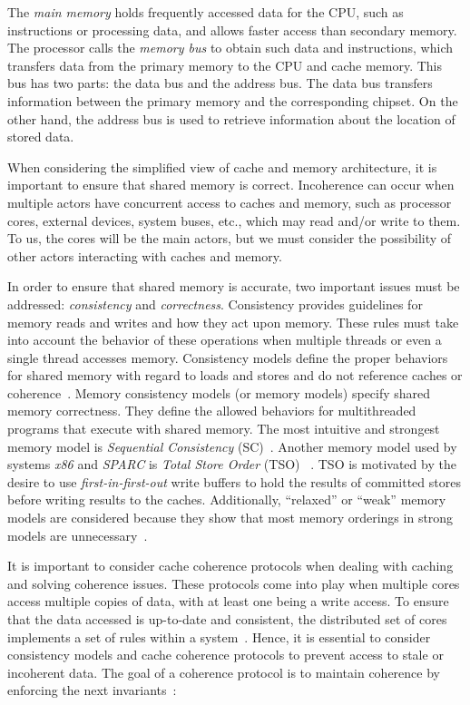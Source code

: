 The \emph{main memory} holds frequently accessed data for the CPU, such as instructions or processing data, and allows faster access than secondary memory. The processor calls the \emph{memory bus} to obtain such data and instructions, which transfers data from the primary memory to the CPU and cache memory. This bus has two parts: the data bus and the address bus. The data bus transfers information between the primary memory and the corresponding chipset. On the other hand, the address bus is used to retrieve information about the location of stored data.


When considering the simplified view of cache and memory architecture, it is important to ensure that shared memory is correct. Incoherence can occur when multiple actors have concurrent access to caches and memory, such as processor cores, external devices, system buses, etc., which may read and/or write to them. To us, the cores will be the main actors, but we must consider the possibility of other actors interacting with caches and memory.

In order to ensure that shared memory is accurate, two important issues must be addressed: \emph{consistency} and \emph{correctness}. Consistency provides guidelines for memory reads and writes and how they act upon memory. These rules must take into account the behavior of these operations when multiple threads or even a single thread accesses memory. Consistency models define the proper behaviors for shared memory with regard to loads and stores and do not reference caches or coherence~\cite{DBLP_series_synthesis_2020Nagarajan}. Memory consistency models (or memory models) specify shared memory correctness. They define the allowed behaviors for multithreaded programs that execute with shared memory. The most intuitive and strongest memory model is \emph{Sequential Consistency} (SC)~\cite{lamport1979how}. Another memory model used by systems \emph{x86} and \emph{SPARC} is \emph{Total Store Order} (TSO) ~\cite{DBLP_conf_tphol_OwensSS09, DBLP_journals_cacm_SewellSONM10, sparc1992sparc}. TSO is motivated by the desire to use \emph{first-in-first-out} write buffers to hold the results of committed stores before writing results to the caches. Additionally, ``relaxed'' or ``weak'' memory models are considered because they show that most memory orderings in strong models are unnecessary~\cite{DBLP_series_synthesis_2020Nagarajan}.


It is important to consider cache coherence protocols when dealing with caching and solving coherence issues. These protocols come into play when multiple cores access multiple copies of data, with at least one being a write access. To ensure that the data accessed is up-to-date and consistent, the distributed set of cores implements a set of rules within a system~\cite{DBLP_series_synthesis_2020Nagarajan}. Hence, it is essential to consider consistency models and cache coherence protocols to prevent access to stale or incoherent data. The goal of a coherence protocol is to maintain coherence by enforcing the next invariants~\cite{DBLP_series_synthesis_2020Nagarajan}:

